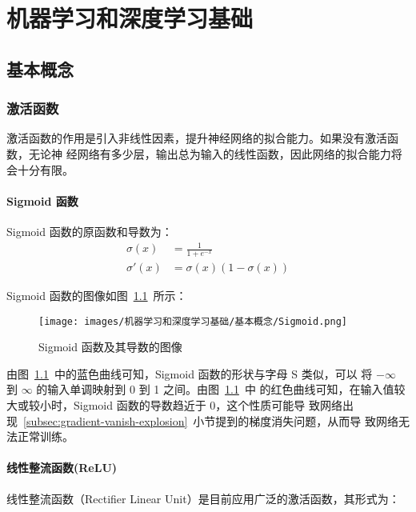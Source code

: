 \part{机器学习和深度学习基础}

\chapter{基本概念}

\section{激活函数}

激活函数的作用是引入非线性因素，提升神经网络的拟合能力。如果没有激活函数，无论神
经网络有多少层，输出总为输入的线性函数，因此网络的拟合能力将会十分有限。

\subsection{Sigmoid 函数}
\label{subsec:Sigmoid}

Sigmoid 函数的原函数和导数为：
\begin{align}
  \label{equ:sigmoid}
  \sigma(x) & = \frac{1}{1 + e^{-x}} \\
  \label{equ:sigmoid-d}
  \sigma'(x) & = \sigma(x) (1-\sigma(x))
\end{align}

Sigmoid 函数的图像如图~\ref{fig:sigmoid}~所示：

\begin{figure}[ht]
  \centering
  \texttt{[image: images/机器学习和深度学习基础/基本概念/Sigmoid.png]}
  \caption{Sigmoid 函数及其导数的图像}
  \label{fig:sigmoid}
\end{figure}

由图~\ref{fig:sigmoid}~中的蓝色曲线可知，Sigmoid 函数的形状与字母 S 类似，可以
将 $-\infty$ 到 $\infty$ 的输入单调映射到 0 到 1 之间。由图~\ref{fig:sigmoid}~中
的红色曲线可知，在输入值较大或较小时，Sigmoid 函数的导数趋近于 0，这个性质可能导
致网络出现~\ref{subsec:gradient-vanish-explosion}~小节提到的梯度消失问题，从而导
致网络无法正常训练。

\subsection{线性整流函数(ReLU)}

线性整流函数（Rectifier Linear Unit）是目前应用广泛的激活函数，其形式为：

